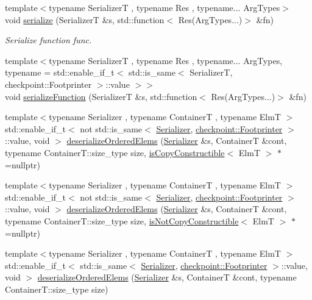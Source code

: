 \begin{DoxyCompactItemize}
\item 
{\footnotesize template$<$typename SerializerT , typename Res , typename... Arg\+Types$>$ }\\void \hyperlink{namespacecheckpoint_ad3043fe034b7bf1d0d864e1e819c84d4}{serialize} (SerializerT \&s, std\+::function$<$ Res(Arg\+Types...)$>$ \&fn)
\begin{DoxyCompactList}\small\item\em Serialize function {\ttfamily func}. \end{DoxyCompactList}\item 
{\footnotesize template$<$typename SerializerT , typename Res , typename... Arg\+Types, typename  = std\+::enable\+\_\+if\+\_\+t$<$    std\+::is\+\_\+same$<$      Serializer\+T,      checkpoint\+::\+Footprinter    $>$\+::value  $>$$>$ }\\void \hyperlink{namespacecheckpoint_a4161978e6d6de385d942cbcbe659817a}{serialize\+Function} (SerializerT \&s, std\+::function$<$ Res(Arg\+Types...)$>$ \&fn)
\item 
{\footnotesize template$<$typename Serializer , typename ContainerT , typename ElmT $>$ }\\std\+::enable\+\_\+if\+\_\+t$<$ not std\+::is\+\_\+same$<$ \hyperlink{structcheckpoint_1_1_serializer}{Serializer}, \hyperlink{structcheckpoint_1_1_footprinter}{checkpoint\+::\+Footprinter} $>$\+::value, void $>$ \hyperlink{namespacecheckpoint_af1b8445cbd2caf9c35727de1cf63c2d9}{deserialize\+Ordered\+Elems} (\hyperlink{structcheckpoint_1_1_serializer}{Serializer} \&s, ContainerT \&cont, typename Container\+T\+::size\+\_\+type size, \hyperlink{namespacecheckpoint_a60a9850fa59d4b236b2f888baf135a95}{is\+Copy\+Constructible}$<$ ElmT $>$ $\ast$=nullptr)
\item 
{\footnotesize template$<$typename Serializer , typename ContainerT , typename ElmT $>$ }\\std\+::enable\+\_\+if\+\_\+t$<$ not std\+::is\+\_\+same$<$ \hyperlink{structcheckpoint_1_1_serializer}{Serializer}, \hyperlink{structcheckpoint_1_1_footprinter}{checkpoint\+::\+Footprinter} $>$\+::value, void $>$ \hyperlink{namespacecheckpoint_abec445c1387cfe9c00c3c328b403378b}{deserialize\+Ordered\+Elems} (\hyperlink{structcheckpoint_1_1_serializer}{Serializer} \&s, ContainerT \&cont, typename Container\+T\+::size\+\_\+type size, \hyperlink{namespacecheckpoint_a141a100f9dcca06fb0b6dbf44a5d6756}{is\+Not\+Copy\+Constructible}$<$ ElmT $>$ $\ast$=nullptr)
\item 
{\footnotesize template$<$typename Serializer , typename ContainerT , typename ElmT $>$ }\\std\+::enable\+\_\+if\+\_\+t$<$ std\+::is\+\_\+same$<$ \hyperlink{structcheckpoint_1_1_serializer}{Serializer}, \hyperlink{structcheckpoint_1_1_footprinter}{checkpoint\+::\+Footprinter} $>$\+::value, void $>$ \hyperlink{namespacecheckpoint_a9976fffc8f39073e5b40ec61d93a5482}{deserialize\+Ordered\+Elems} (\hyperlink{structcheckpoint_1_1_serializer}{Serializer} \&s, ContainerT \&cont, typename Container\+T\+::size\+\_\+type size)

\end{DoxyCompactItemize}
